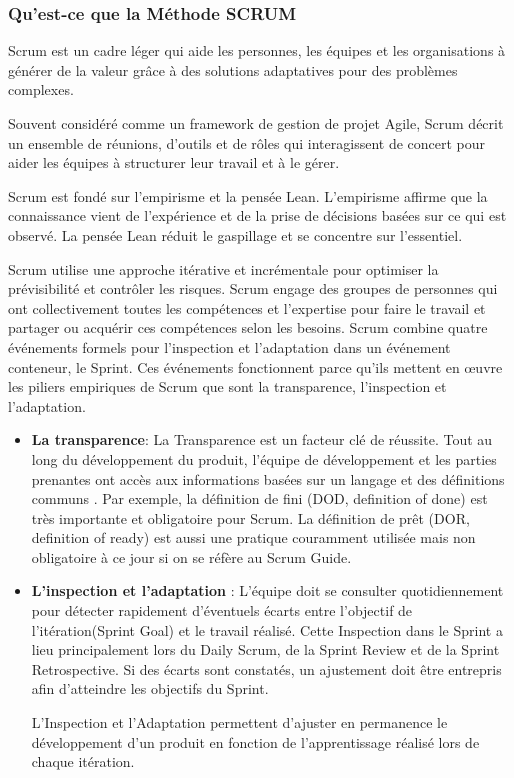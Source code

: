 \subsubsection{Qu’est-ce que la Méthode SCRUM}

Scrum est un cadre léger qui aide les personnes, les équipes et les organisations à générer de la valeur grâce à
des solutions adaptatives pour des problèmes complexes\cite{schwaber2011scrum}.

Souvent considéré comme un framework de gestion de projet Agile, Scrum décrit un ensemble de réunions, d'outils et de rôles qui interagissent de concert pour aider les équipes à structurer leur travail et à le gérer.

Scrum est fondé sur l'empirisme et la pensée Lean. L'empirisme affirme que la connaissance vient de l'expérience et de la prise de décisions basées sur ce qui est observé. La pensée Lean réduit le gaspillage et se concentre sur l'essentiel\cite{schwaber2011scrum}.

Scrum utilise une approche itérative et incrémentale pour optimiser la prévisibilité et contrôler les risques. Scrum engage des groupes de personnes qui ont collectivement toutes les compétences et l'expertise pour faire le travail et partager ou acquérir ces compétences selon les besoins. Scrum combine quatre événements formels pour l'inspection et l'adaptation dans un événement conteneur, le Sprint. Ces événements fonctionnent parce qu'ils mettent en œuvre les piliers empiriques de Scrum que sont la transparence, l'inspection et l'adaptation.

\vspace{1em}
\begin{itemize}
	\setlength\itemsep{1em}
	\item \textbf{La transparence}: La Transparence est un facteur clé de réussite. Tout au long du développement du produit, l’équipe de développement et les parties prenantes ont accès aux informations basées sur un langage et des définitions communs . Par exemple, la définition de fini (DOD, definition of done) est très importante et obligatoire pour Scrum. La définition de prêt (DOR, definition of ready) est aussi une pratique couramment utilisée mais non obligatoire à ce jour si on se réfère au Scrum Guide.
	\item \textbf{L'inspection et l'adaptation} : L’équipe doit se consulter quotidiennement pour détecter rapidement d’éventuels écarts entre l’objectif de l’itération(Sprint Goal) et le travail réalisé. Cette Inspection dans le Sprint a lieu principalement lors du Daily Scrum, de la Sprint Review et de la Sprint Retrospective. Si des écarts sont constatés, un ajustement doit être entrepris afin d’atteindre les objectifs du Sprint.

	      L’Inspection et l’Adaptation permettent d’ajuster en permanence le développement d’un produit en fonction de l’apprentissage réalisé lors de chaque itération.
\end{itemize}


